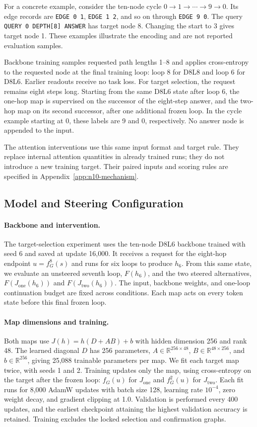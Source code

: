 \documentclass{article}
\begin{document}
For a concrete example, consider the ten-node cycle $0\to1\to\cdots\to9\to0$. Its edge records are \texttt{EDGE 0 1}, \texttt{EDGE 1 2}, and so on through \texttt{EDGE 9 0}. The query \texttt{QUERY 0 DEPTH[8] ANSWER} has target node 8. Changing the start to 3 gives target node 1. These examples illustrate the encoding and are not reported evaluation samples.

Backbone training samples requested path lengths 1--8 and applies cross-entropy to the requested node at the final training loop: loop 8 for D8L8 and loop 6 for D8L6. Earlier readouts receive no task loss. For target selection, the request remains eight steps long. Starting from the same D8L6 state after loop 6, the one-hop map is supervised on the successor of the eight-step answer, and the two-hop map on its second successor, after one additional frozen loop. In the cycle example starting at 0, these labels are 9 and 0, respectively. No answer node is appended to the input.

The attention interventions use this same input format and target rule. They replace internal attention quantities in already trained runs; they do not introduce a new training target. Their paired inputs and scoring rules are specified in Appendix~\ref{app:n10-mechanism}.

\subsection{Model and Steering Configuration}
\label{app:target-setup}
\paragraph{Backbone and intervention.}
The target-selection experiment uses the ten-node D8L6 backbone trained with seed 6 and saved at update 16,000. It receives a request for the eight-hop endpoint $u=f_G^8(s)$ and runs for six loops to produce $h_6$. From this same state, we evaluate an unsteered seventh loop, $F(h_6)$, and the two steered alternatives, $F(J_{\mathrm{one}}(h_6))$ and $F(J_{\mathrm{two}}(h_6))$. The input, backbone weights, and one-loop continuation budget are fixed across conditions. Each map acts on every token state before this final frozen loop.

\paragraph{Map dimensions and training.}
Both maps use $J(h)=h(D+AB)+b$ with hidden dimension 256 and rank 48. The learned diagonal $D$ has 256 parameters, $A\in\mathbb{R}^{256\times48}$, $B\in\mathbb{R}^{48\times256}$, and $b\in\mathbb{R}^{256}$, giving 25,088 trainable parameters per map. We fit each target map twice, with seeds 1 and 2. Training updates only the map, using cross-entropy on the target after the frozen loop: $f_G(u)$ for $J_{\mathrm{one}}$ and $f_G^2(u)$ for $J_{\mathrm{two}}$. Each fit runs for 8,000 AdamW updates with batch size 128, learning rate $10^{-4}$, zero weight decay, and gradient clipping at 1.0. Validation is performed every 400 updates, and the earliest checkpoint attaining the highest validation accuracy is retained. Training excludes the locked selection and confirmation graphs.
\end{document}
